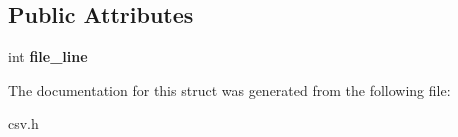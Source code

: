 \subsection*{Public Attributes}
\begin{DoxyCompactItemize}
\item 
int {\bfseries file\+\_\+line}\label{structio_1_1error_1_1with__file__line_a391298c37172bcdb83aeb3daf65d5a0e}

\end{DoxyCompactItemize}


The documentation for this struct was generated from the following file\+:\begin{DoxyCompactItemize}
\item 
csv.\+h\end{DoxyCompactItemize}
